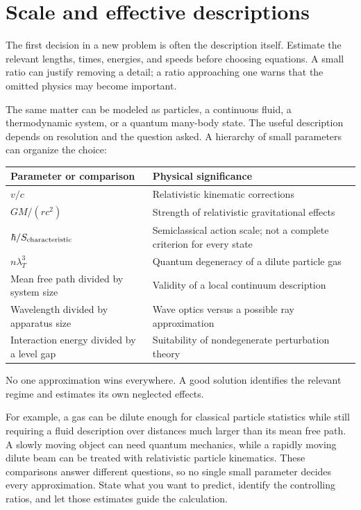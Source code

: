 \documentclass[11pt,oneside]{book}
\theoremstyle{reviewstyle}
\begin{document}
\section{Scale and effective descriptions}
The first decision in a new problem is often the description itself. Estimate the relevant lengths, times, energies, and speeds before choosing equations. A small ratio can justify removing a detail; a ratio approaching one warns that the omitted physics may become important.

The same matter can be modeled as particles, a continuous fluid, a thermodynamic system, or a quantum many-body state. The useful description depends on resolution and the question asked. A hierarchy of small parameters can organize the choice:
\begin{center}
\begin{tabular}{p{}p{}}
\toprule
Parameter or comparison & Physical significance\\
\midrule
$v/c$ & Relativistic kinematic corrections\\
$GM/(rc^2)$ & Strength of relativistic gravitational effects\\
$\hbar/S_{\rm characteristic}$ & Semiclassical action scale; not a complete criterion for every state\\
$n\lambda_T^3$ & Quantum degeneracy of a dilute particle gas\\
Mean free path divided by system size & Validity of a local continuum description\\
Wavelength divided by apparatus size & Wave optics versus a possible ray approximation\\
Interaction energy divided by a level gap & Suitability of nondegenerate perturbation theory\\
\bottomrule
\end{tabular}
\end{center}
No one approximation wins everywhere. A good solution identifies the relevant regime and estimates its own neglected effects.

For example, a gas can be dilute enough for classical particle statistics while still requiring a fluid description over distances much larger than its mean free path. A slowly moving object can need quantum mechanics, while a rapidly moving dilute beam can be treated with relativistic particle kinematics. These comparisons answer different questions, so no single small parameter decides every approximation. State what you want to predict, identify the controlling ratios, and let those estimates guide the calculation.
\end{document}
